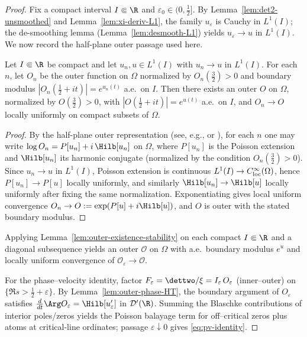 \begin{proof}
Fix a compact interval \(I\Subset\R\) and \(\varepsilon_0\in(0,\tfrac12]\).
By Lemma~\ref{lem:det2-unsmoothed} and Lemma~\ref{lem:xi-deriv-L1}, the family \(u_\varepsilon\) is Cauchy in \(L^1(I)\); the de-smoothing lemma (Lemma~\ref{lem:desmooth-L1}) yields \(u_\varepsilon\to u\) in \(L^1(I)\).
We now record the half-plane outer passage used here.
\begin{lemma}\label{lem:outer-existence-stability}
Let \(I\Subset\R\) be compact and let \(u_n,u\in L^1(I)\) with \(u_n\to u\) in \(L^1(I)\).
For each \(n\), let \(O_n\) be the outer function on \(\Omega\) normalized by \(O_n(\tfrac32)>0\) and boundary modulus \(|O_n(\tfrac12+it)|=e^{u_n(t)}\) a.e.\ on \(I\).
Then there exists an outer \(O\) on \(\Omega\), normalized by \(O(\tfrac32)>0\), with \(|O(\tfrac12+it)|=e^{u(t)}\) a.e.\ on \(I\), and \(O_n\to O\) locally uniformly on compact subsets of \(\Omega\).
\end{lemma}
\begin{proof}
By the half-plane outer representation (see, e.g., \cite[Ch.~II]{Garnett} or \cite[Ch.~2]{RosenblumRovnyak}),
for each \(n\) one may write \(\log O_n = P[u_n] + i\,\Hilb[u_n]\) on \(\Omega\), where \(P[u_n]\) is the Poisson extension and \(\Hilb[u_n]\) its harmonic conjugate (normalized by the condition \(O_n(\tfrac32)>0\)).
Since \(u_n\to u\) in \(L^1(I)\), Poisson extension is continuous \(L^1(I)\to C^\infty_{\rm loc}(\Omega)\), hence \(P[u_n]\to P[u]\) locally uniformly, and similarly \(\Hilb[u_n]\to\Hilb[u]\) locally uniformly after fixing the same normalization.
Exponentiating gives local uniform convergence \(O_n\to O:=\exp(P[u]+i\Hilb[u])\), and \(O\) is outer with the stated boundary modulus.
\end{proof}
Applying Lemma~\ref{lem:outer-existence-stability} on each compact \(I\Subset\R\) and a diagonal subsequence yields an outer \(\mathcal O\) on \(\Omega\) with a.e.\ boundary modulus \(e^{u}\) and locally uniform convergence of \(\mathcal O_\varepsilon\to\mathcal O\).

For the phase--velocity identity, factor \(F_\varepsilon=\dettwo/\xi=I_\varepsilon\,O_\varepsilon\) (inner--outer) on \(\{\Re s>\tfrac12+\varepsilon\}\).
By Lemma~\ref{lem:outer-phase-HT}, the boundary argument of \(O_\varepsilon\) satisfies \(\frac{d}{dt}\Arg O_\varepsilon=\Hilb[u_\varepsilon']\) in \(\mathcal D'(\R)\).
Summing the Blaschke contributions of interior poles/zeros yields the Poisson balayage term for off--critical zeros plus atoms at critical-line ordinates; passage \(\varepsilon\downarrow 0\) gives \eqref{eq:pv-identity}.
\end{proof}

